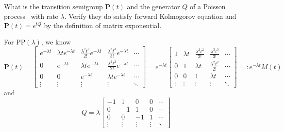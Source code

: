 \documentclass[  11pt]{article}
\newcommand{\PP}{\mbox{PP}}
\newcommand{\Pm}{{\mathbf{P}}}
\newcommand{\pp}{Poisson process }
\begin{document}
\begin{ExerciseList}

\Exercise

 What is the transition semigroup $\Pm(t)$ and the generator $Q$ of a \pp\ with rate $\lambda$.
Verify they do satisfy  forward Kolmogorov equation and $\Pm(t)=e^{tQ}$ by the definition of matrix exponential. 


\Answer
For $\PP(\lambda)$, we know 
\[
\Pm(t)= \begin{bmatrix}
e^{-\lambda t} & \lambda t e^{-\lambda t} & \frac{\lambda^2 t^2}{2!} e^{-\lambda t}  &  \frac{\lambda^3 t^3}{3!} e^{-\lambda t} & \cdots \\
0 & e^{-\lambda t} & \lambda t e^{-\lambda t} & \frac{\lambda^2 t^2}{2!} e^{-\lambda t}  & \cdots \\
0 & 0 &e^{-\lambda t }& \lambda t e^{-\lambda t}  & \cdots \\
\vdots & \vdots & \vdots & \vdots & \ddots
\end{bmatrix}
=e^{-\lambda t}\begin{bmatrix}
1& \lambda t & \frac{\lambda^2 t^2}{2!}   &  \frac{\lambda^3 t^3}{3!}   & \cdots \\
0 &1 & \lambda t   & \frac{\lambda^2 t^2}{2!}   & \cdots \\
0 & 0 &1& \lambda t   & \cdots \\
\vdots & \vdots & \vdots & \vdots & \ddots
\end{bmatrix}
=: e^{-\lambda t} M(t)
\]
and 
\[Q= \lambda \begin{bmatrix}
-1 & 1 & 0 & 0 & \cdots \\
0 & -1 & 1 & 0 & \cdots \\
0 & 0 &-1&  1  & \cdots \\
\vdots & \vdots & \vdots & \vdots & \ddots
\end{bmatrix}
\]


\end{ExerciseList}
\end{document}
